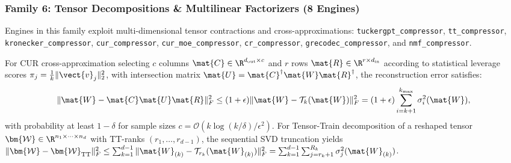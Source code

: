 \subsubsection{Family 6: Tensor Decompositions \& Multilinear Factorizers (8 Engines)}
Engines in this family exploit multi-dimensional tensor contractions and cross-approximations: \texttt{tuckergpt\_compressor}, \texttt{tt\_compressor}, \texttt{kronecker\_compressor}, \texttt{cur\_compressor}, \texttt{cur\_moe\_compressor}, \texttt{cr\_compressor}, \texttt{grecodec\_compressor}, and \texttt{nmf\_compressor}.
\begin{theorem}
\label{thm:frob_tensor_decomp}
For CUR cross-approximation selecting $c$ columns $\mat{C} \in \R^{d_{\text{out}} \times c}$ and $r$ rows $\mat{R} \in \R^{r \times d_{\text{in}}}$ according to statistical leverage scores $\pi_j = \frac{1}{k}\|\vect{v}_j\|_2^2$, with intersection matrix $\mat{U} = \mat{C}^\dagger \mat{W} \mat{R}^\dagger$, the reconstruction error satisfies:
\begin{equation}
\|\mat{W} - \mat{C} \mat{U} \mat{R}\|_F^2 \le (1 + \epsilon) \|\mat{W} - \mathcal{T}_k(\mat{W})\|_F^2 = (1 + \epsilon) \sum_{i=k+1}^{k_{\max}} \sigma_i^2(\mat{W}),
\label{eq:frob_bound_cur_family}
\end{equation}
with probability at least $1 - \delta$ for sample sizes $c = \mathcal{O}(k \log(k/\delta) / \epsilon^2)$. For Tensor-Train decomposition of a reshaped tensor $\bm{\mathcal{W}} \in \R^{n_1 \times \dots \times n_d}$ with TT-ranks $(r_1, \dots, r_{d-1})$, the sequential SVD truncation yields $\|\bm{\mathcal{W}} - \bm{\mathcal{W}}_{\text{TT}}\|_F^2 \le \sum_{k=1}^{d-1} \|\mat{W}_{(k)} - \mathcal{T}_{r_k}(\mat{W}_{(k)})\|_F^2 = \sum_{k=1}^{d-1} \sum_{j=r_k+1}^{R_k} \sigma_j^2(\mat{W}_{(k)})$.
\end{theorem}

